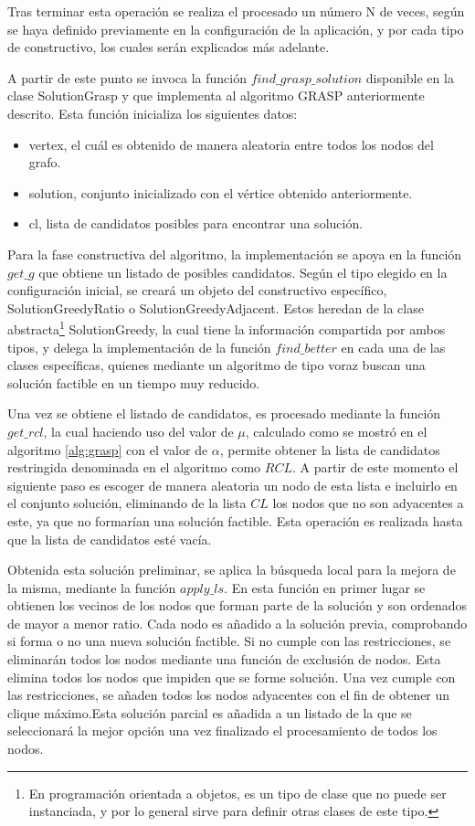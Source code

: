 Tras terminar esta operación se realiza el procesado un número N de veces, según se haya definido previamente en la configuración de la aplicación, y por cada tipo de constructivo, los cuales serán explicados más adelante.

A partir de este punto se invoca la función $find\_grasp\_solution$ disponible en la clase SolutionGrasp y que implementa al algoritmo \gls{GRASP} anteriormente descrito. Esta función inicializa los siguientes datos:
\begin{itemize}
	\item vertex, el cuál es obtenido de manera aleatoria entre todos los nodos del grafo.
	\item solution, conjunto inicializado con el vértice obtenido anteriormente.
	\item cl, lista de candidatos posibles para encontrar una solución.
\end{itemize}

Para la fase constructiva del algoritmo, la implementación se apoya en la función $get\_g$ que obtiene un listado de posibles candidatos. Según el tipo elegido en la configuración inicial, se creará un objeto del constructivo específico, SolutionGreedyRatio o SolutionGreedyAdjacent. Estos heredan de la clase abstracta\footnote{En programación orientada a objetos, es un tipo de clase que no puede ser instanciada, y por lo general sirve para definir otras clases de este tipo.} SolutionGreedy, la cual tiene la información compartida por ambos tipos, y delega la implementación de la función $find\_better$ en cada una de las clases específicas, quienes mediante un algoritmo de tipo voraz buscan una solución factible en un tiempo muy reducido.

Una vez se obtiene el listado de candidatos, es procesado mediante la función $get\_rcl$, la cual haciendo uso del valor de $\mu$, calculado como se mostró en el algoritmo \ref{alg:grasp} con el valor de $\alpha$, permite obtener la lista de candidatos restringida denominada en el algoritmo como $RCL$. A partir de este momento el siguiente paso es escoger de manera aleatoria un nodo de esta lista e incluirlo en el conjunto solución, eliminando de la lista $CL$ los nodos que no son adyacentes a este, ya que no formarían una solución factible. Esta operación es realizada hasta que la lista de candidatos esté vacía.

Obtenida esta solución preliminar, se aplica la búsqueda local para la mejora de la misma, mediante la función $apply\_ls$. En esta función en primer lugar se obtienen los vecinos de los nodos que forman parte de la solución y son ordenados de mayor a menor ratio. Cada nodo es añadido a la solución previa, comprobando si forma o no una nueva solución factible. Si no cumple con las restricciones, se eliminarán todos los nodos mediante una función de exclusión de nodos. Esta elimina todos los nodos que impiden que se forme solución. Una vez cumple con las restricciones, se añaden todos los nodos adyacentes con el fin de obtener un clique máximo.Esta solución parcial es añadida a un listado de la que se seleccionará la mejor opción una vez finalizado el procesamiento de todos los nodos.

